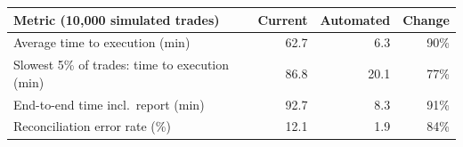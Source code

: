 \begin{tabular}{@{}lrrr@{}}
\toprule
\textbf{Metric (10{,}000 simulated trades)} & \textbf{Current} & \textbf{Automated} & \textbf{Change} \\
\midrule
Average time to execution (min) & 62.7 & 6.3 & \textminus{}90\% \\
Slowest 5\% of trades: time to execution (min) & 86.8 & 20.1 & \textminus{}77\% \\
End-to-end time incl.\ report (min) & 92.7 & 8.3 & \textminus{}91\% \\
Reconciliation error rate (\%) & 12.1 & 1.9 & \textminus{}84\% \\
\bottomrule
\end{tabular}